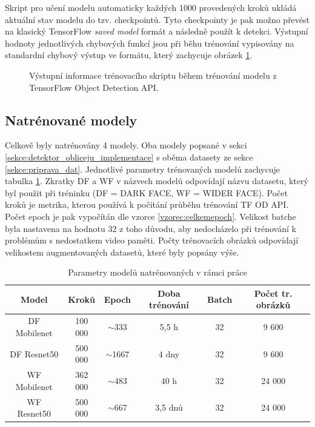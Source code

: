 Skript pro učení modelu automaticky každých 1000 provedených kroků ukládá aktuální stav modelu do tzv. checkpointů. Tyto checkpointy je pak možno převést na klasický TensorFlow \emph{saved model} formát a následně použít k detekci. Výstupní hodnoty jednotlivých chybových funkcí jsou při běhu trénování vypisovány na standardní chybový výstup ve formátu, který zachycuje obrázek \ref{obrazek:trenovani}.

\begin{figure}[H]
  \begin{center}
  \label{obrazek:trenovani}
  \caption{Výstupní informace trénovacího skriptu během trénování modelu z TensorFlow Object Detection API.}
  \end{center}
\end{figure}

\subsection*{Natrénované modely}
Celkově byly natrénovány 4 modely. Oba modely popsané v sekci \ref{sekce:detektor_obliceju_implementace} s oběma datasety ze sekce \ref{sekce:priprava_dat}. Jednotlivé parametry trénovaných modelů zachycuje tabulka \ref{tabulka:trenovanimodely}. Zkratky  DF a WF v názvech modelů odpovídají názvu datasetu, který byl použit při tréninku (DF = DARK FACE, WF = WIDER FACE). Počet kroků je metrika, kterou používá k počítání průběhu trénování TF OD API. Počet epoch je pak vypočítán dle vzorce \ref{vzorec:celkemepoch}. Velikost batche byla nastavena na hodnotu 32 z toho důvodu, aby nedocházelo při trénování k problémům s nedostatkem video paměti. Počty trénovacích obrázků odpovídají velikostem augmentovaných datasetů, které byly popsány výše.

\begin{table}[h]
  \begin{tabular}{|c|c|c|c|c|c|}
    \hline
    \rowcolor[HTML]{E0DBDB} 
    {\color[HTML]{333333} \textbf{Model}} & {\color[HTML]{333333} \textbf{Kroků}} & {\color[HTML]{333333} \textbf{Epoch}} & {\color[HTML]{333333} \textbf{Doba trénování}} & {\color[HTML]{333333} \textbf{Batch}} & {\color[HTML]{333333} \textbf{Počet tr. obrázků}} \\ \hline
    DF Mobilenet  & 100 000 & $\sim$333 & 5,5 h  & 32  & 9 600        \\ \hline
    DF Resnet50  & 500 000  & $\sim$1667   & 4 dny  & 32  & 9 600   \\ \hline
    WF Mobilenet    & 362 000      & $\sim$483 & 40 h   & 32  & 24 000  \\ \hline
    WF Resnet50   & 500 000  & $\sim$667  & 3,5 dnů   & 32  & 24 000  \\ \hline
  \end{tabular}
  \label{tabulka:trenovanimodely}
  \caption{Parametry modelů natrénovaných v rámci práce}
\end{table}

